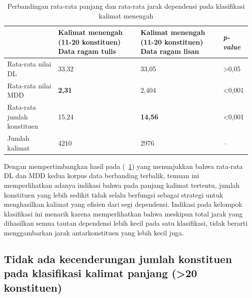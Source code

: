 \begin{table}
\begin{center}
\begin{small}
 \caption{Perbandingan rata-rata panjang dan rata-rata jarak dependensi pada klasifikasi kalimat menengah}\label{tab:DL_MDD_menengah}  
 \begin{tabular}{| p{3.2cm} | p{3.2cm} | p{3.2cm} | p{2cm} |}
    \hline
 & Kalimat menengah \newline (11-20 konstituen) \newline Data ragam tulis & Kalimat menengah \newline (11-20 konstituen) \newline Data ragam lisan & \textit{p-value} \\ \hline
 Rata-rata nilai DL & 33,32 & 33,05 & \textgreater 0,05  \\ \hline
 Rata-rata nilai MDD & \textbf{2,31} & 2,404 & \textless 0,001 \\ \hline
 Rata-rata jumlah konstituen & 15,24 & \textbf{14,56} & \textless 0,001 \\ \hline
 Jumlah kalimat & 4210 & 2976 & -- \\ \hline
   \end{tabular}
   \end{small}
\end{center}
\end{table}

Dengan mempertimbangkan hasil pada (\tab~\ref{tab:DL_MDD_menengah}) yang menunjukkan bahwa rata-rata DL dan MDD kedua korpus data berbanding terbalik, temuan ini memperlihatkan adanya indikasi bahwa pada panjang kalimat tertentu, jumlah konstituen yang lebih sedikit tidak selalu berfungsi sebagai strategi untuk menghasilkan kalimat yang efisien dari segi dependensi. Indikasi pada kelompok klasifikasi ini menarik karena memperlihatkan bahwa meskipun total jarak yang dihasilkan semua tautan dependensi lebih kecil pada satu klasifikasi, tidak berarti menggambarkan jarak antarkonstituen yang lebih kecil juga.

\subsection{Tidak ada kecenderungan jumlah konstituen pada klasifikasi kalimat panjang (\textgreater20 konstituen)}

